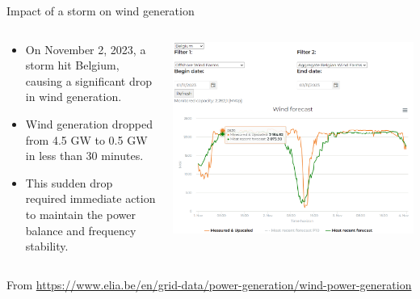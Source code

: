 \begin{frame}{Impact of a storm on wind generation}
  \begin{columns}
  \begin{column}{0.5\textwidth}
      \begin{itemize}
        \item On November 2, 2023, a storm hit Belgium, causing a significant drop in wind generation.
        \item Wind generation dropped from 4.5 GW to 0.5 GW in less than 30 minutes.
        \item This sudden drop required immediate action to maintain the power balance and frequency stability.
    \end{itemize}
    
  \end{column}
  \begin{column}{0.5\textwidth}
    \begin{center}
        \includegraphics[width=\textwidth]{images/elia_storm_offshorewind_20231102.PNG}
    \end{center}
  \end{column}
\end{columns}
{\small From \url{https://www.elia.be/en/grid-data/power-generation/wind-power-generation}}
    
\end{frame}


